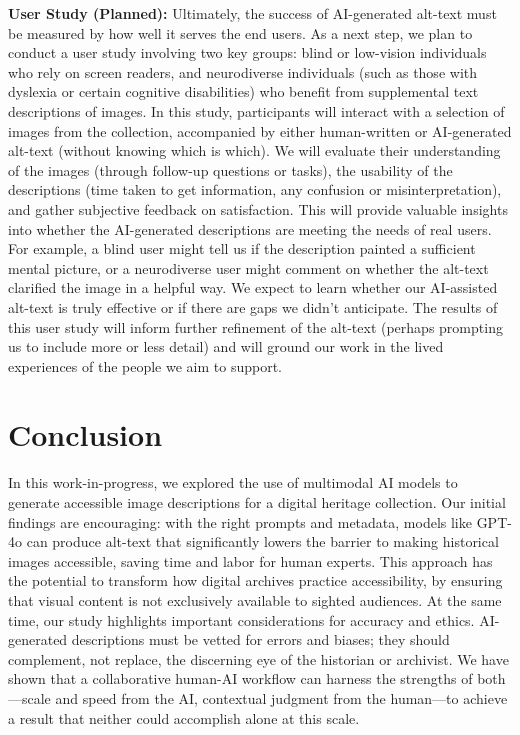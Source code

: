 \documentclass{anthology-ch}         %
\begin{document}
\textbf{User Study (Planned):} Ultimately, the success of AI-generated alt-text must be measured by how well it serves the end users. As a next step, we plan to conduct a user study involving two key groups: blind or low-vision individuals who rely on screen readers, and neurodiverse individuals (such as those with dyslexia or certain cognitive disabilities) who benefit from supplemental text descriptions of images. In this study, participants will interact with a selection of images from the collection, accompanied by either human-written or AI-generated alt-text (without knowing which is which). We will evaluate their understanding of the images (through follow-up questions or tasks), the usability of the descriptions (time taken to get information, any confusion or misinterpretation), and gather subjective feedback on satisfaction. This will provide valuable insights into whether the AI-generated descriptions are meeting the needs of real users. For example, a blind user might tell us if the description painted a sufficient mental picture, or a neurodiverse user might comment on whether the alt-text clarified the image in a helpful way. We expect to learn whether our AI-assisted alt-text is truly effective or if there are gaps we didn’t anticipate. The results of this user study will inform further refinement of the alt-text (perhaps prompting us to include more or less detail) and will ground our work in the lived experiences of the people we aim to support.

\section{Conclusion}

In this work-in-progress, we explored the use of multimodal AI models to generate accessible image descriptions for a digital heritage collection. Our initial findings are encouraging: with the right prompts and metadata, models like GPT-4o can produce alt-text that significantly lowers the barrier to making historical images accessible, saving time and labor for human experts. This approach has the potential to transform how digital archives practice accessibility, by ensuring that visual content is not exclusively available to sighted audiences. At the same time, our study highlights important considerations for accuracy and ethics. AI-generated descriptions must be vetted for errors and biases; they should complement, not replace, the discerning eye of the historian or archivist. We have shown that a collaborative human-AI workflow can harness the strengths of both---scale and speed from the AI, contextual judgment from the human---to achieve a result that neither could accomplish alone at this scale.
\end{document}
